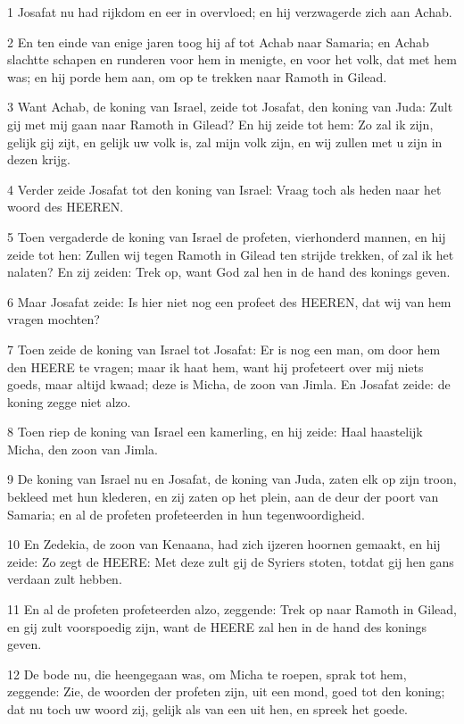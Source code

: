 \par 1 Josafat nu had rijkdom en eer in overvloed; en hij verzwagerde zich aan Achab.
\par 2 En ten einde van enige jaren toog hij af tot Achab naar Samaria; en Achab slachtte schapen en runderen voor hem in menigte, en voor het volk, dat met hem was; en hij porde hem aan, om op te trekken naar Ramoth in Gilead.
\par 3 Want Achab, de koning van Israel, zeide tot Josafat, den koning van Juda: Zult gij met mij gaan naar Ramoth in Gilead? En hij zeide tot hem: Zo zal ik zijn, gelijk gij zijt, en gelijk uw volk is, zal mijn volk zijn, en wij zullen met u zijn in dezen krijg.
\par 4 Verder zeide Josafat tot den koning van Israel: Vraag toch als heden naar het woord des HEEREN.
\par 5 Toen vergaderde de koning van Israel de profeten, vierhonderd mannen, en hij zeide tot hen: Zullen wij tegen Ramoth in Gilead ten strijde trekken, of zal ik het nalaten? En zij zeiden: Trek op, want God zal hen in de hand des konings geven.
\par 6 Maar Josafat zeide: Is hier niet nog een profeet des HEEREN, dat wij van hem vragen mochten?
\par 7 Toen zeide de koning van Israel tot Josafat: Er is nog een man, om door hem den HEERE te vragen; maar ik haat hem, want hij profeteert over mij niets goeds, maar altijd kwaad; deze is Micha, de zoon van Jimla. En Josafat zeide: de koning zegge niet alzo.
\par 8 Toen riep de koning van Israel een kamerling, en hij zeide: Haal haastelijk Micha, den zoon van Jimla.
\par 9 De koning van Israel nu en Josafat, de koning van Juda, zaten elk op zijn troon, bekleed met hun klederen, en zij zaten op het plein, aan de deur der poort van Samaria; en al de profeten profeteerden in hun tegenwoordigheid.
\par 10 En Zedekia, de zoon van Kenaana, had zich ijzeren hoornen gemaakt, en hij zeide: Zo zegt de HEERE: Met deze zult gij de Syriers stoten, totdat gij hen gans verdaan zult hebben.
\par 11 En al de profeten profeteerden alzo, zeggende: Trek op naar Ramoth in Gilead, en gij zult voorspoedig zijn, want de HEERE zal hen in de hand des konings geven.
\par 12 De bode nu, die heengegaan was, om Micha te roepen, sprak tot hem, zeggende: Zie, de woorden der profeten zijn, uit een mond, goed tot den koning; dat nu toch uw woord zij, gelijk als van een uit hen, en spreek het goede.
